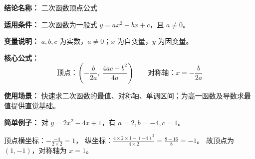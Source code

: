 \textbf{结论名称：} 二次函数顶点公式

\textbf{适用条件：} 二次函数为一般式 \( y=ax^{2}+bx+c \)，且 \( a\neq 0 \)。

\textbf{变量说明：} \( a,b,c \) 为实数，\( a\neq 0 \)；\( x \) 为自变量，\( y \) 为因变量。

\textbf{核心公式：}
\[
\boxed{\text{顶点：}\left(-\frac{b}{2a},\ \frac{4ac-b^{2}}{4a}\right)} \qquad
\boxed{\text{对称轴：} x=-\frac{b}{2a}}
\]

\textbf{使用场景：} 快速求二次函数的最值、对称轴、单调区间；为高一函数及导数求最值提供直觉基础。

\textbf{简单例子：} 对 \( y=2x^{2}-4x+1 \)，有 \( a=2,b=-4,c=1 \)。

顶点横坐标：\( -\frac{-4}{2\times 2}=1 \)，
纵坐标：\( \frac{4\times2\times 1-(-4)^{2}}{4\times 2}=\frac{8-16}{8}=-1 \)。
故顶点为 \( (1,-1) \)，对称轴为 \( x=1 \)。